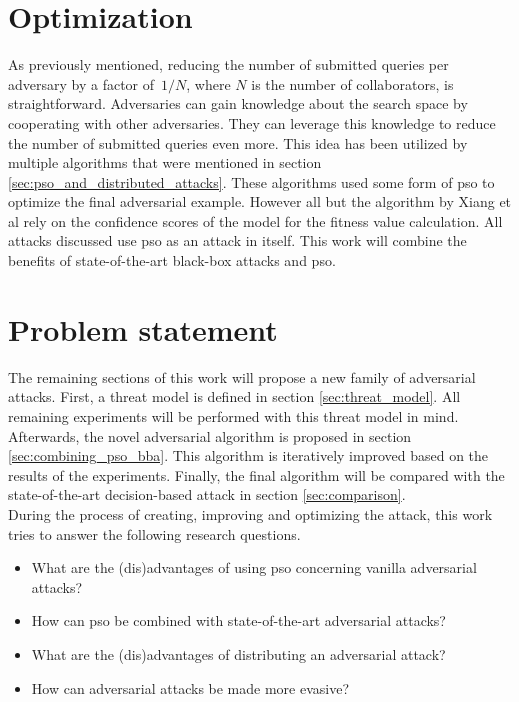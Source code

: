 \section{Optimization} \label{sec:optimization_approach}
As previously mentioned, reducing the number of submitted queries per adversary by a factor of~$1/N$, where $N$ is the number of collaborators, is straightforward. Adversaries can gain knowledge about the search space by cooperating with other adversaries. They can leverage this knowledge to reduce the number of submitted queries even more. This idea has been utilized by multiple algorithms that were mentioned in section \ref{sec:pso_and_distributed_attacks}. These algorithms used some form of \gls{pso} to optimize the final adversarial example. However all but the algorithm by Xiang et al \cite{distributed_pso_attack} rely on the confidence scores of the model for the fitness value calculation. All attacks discussed use \gls{pso} as an attack in itself. This work will combine the benefits of state-of-the-art black-box attacks and \gls{pso}.

\section{Problem statement}\label{sec:approach}
The remaining sections of this work will propose a new family of adversarial attacks. First, a threat model is defined in section \ref{sec:threat_model}. All remaining experiments will be performed with this threat model in mind. Afterwards, the novel adversarial algorithm is proposed in section \ref{sec:combining_pso_bba}. This algorithm is iteratively improved based on the results of the experiments. Finally, the final algorithm will be compared with the state-of-the-art decision-based attack in section \ref{sec:comparison}.\\

During the process of creating, improving and optimizing the attack, this work tries to answer the following research questions. 
\begin{itemize}
	\item What are the (dis)advantages of using \gls{pso} concerning vanilla adversarial attacks?
	\item How can \gls{pso} be combined with state-of-the-art adversarial attacks?
	\item What are the (dis)advantages of distributing an adversarial attack?
	\item How can adversarial attacks be made more evasive?
\end{itemize} 

